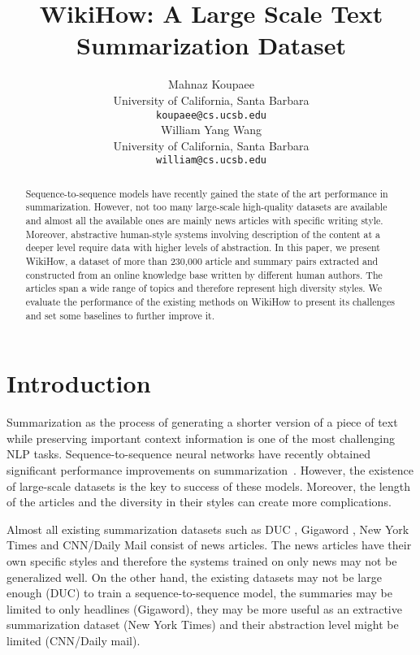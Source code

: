 \documentclass[11pt,a4paper]{article}
\title{WikiHow: A Large Scale Text Summarization Dataset}
\author{Mahnaz Koupaee \\
  University of California, Santa Barbara \\
  {\tt koupaee@cs.ucsb.edu} \\\And
  William Yang Wang \\
 University of California, Santa Barbara \\
  {\tt william@cs.ucsb.edu} \\}
\date{}
\begin{document}
\maketitle
\begin{abstract}
Sequence-to-sequence models have recently gained the state of the art performance in summarization. However, not too many large-scale high-quality datasets are available and almost all the available ones are mainly news articles with specific writing style. Moreover, abstractive human-style systems involving description of the content at a deeper level require data with higher levels of abstraction.
In this paper, we present WikiHow, a dataset of more than 230,000 article and summary pairs extracted and constructed from an online knowledge base written by different human authors. The articles span a wide range of topics and therefore represent high diversity styles. We evaluate the performance of the existing methods on WikiHow to present its challenges and set some baselines to further improve it. 
\end{abstract}

\section{Introduction}
Summarization as the process of generating a shorter version of a piece of text while preserving important context information is one of the most challenging NLP tasks. Sequence-to-sequence neural networks have recently obtained significant performance improvements on summarization~\cite{rush2015neural,chopra2016abstractive}. However, the existence of large-scale datasets is the key to success of these models. Moreover, the length of the articles and the diversity in their styles can create more complications. 

Almost all existing summarization datasets such as DUC \cite{harman2004effects}, Gigaword \cite{napoles2012annotated}, New York Times \cite{sandhaus2008new} and CNN/Daily Mail \cite{nallapati2016abstractive} consist of news articles. The news articles have their own specific styles and therefore the systems trained on only news may not be generalized well. On the other hand, the existing datasets may not be large enough (DUC) to train a sequence-to-sequence model, the summaries may be limited to only headlines (Gigaword), they may be more useful as an extractive summarization dataset (New York Times) and their abstraction level might be limited (CNN/Daily mail).
\end{document}
